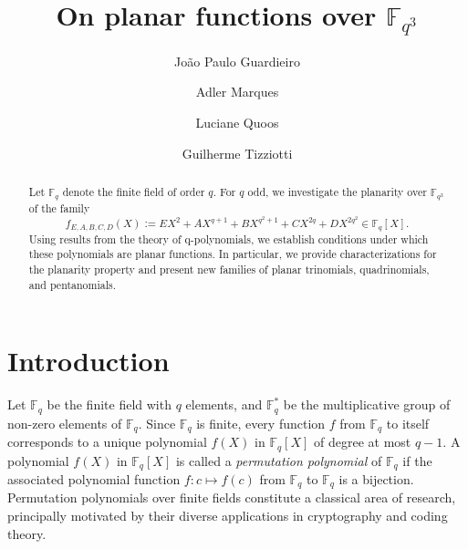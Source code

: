 \documentclass[12pt]{amsart}
\def\fq{\mathbb{F}_{q}}
\def\fqt{\mathbb{F}_{q^3}}
\begin{document}
	
\title[On planar functions over $\fqt$]{On planar functions over $\fqt$}
\author[J.P.Guardieiro]{João Paulo Guardieiro}
\address{Centro de Ciências Exatas e Tecnologia - Universidade Federal do Maranhão, Av. dos Portugueses, 1966 - Bacanga, São Luís - MA, Brazil.}
\address{Instituto de Matemática - Universidade Federal do Rio de Janeiro, Av. Athos da Silveira Ramos, 149 - Cidade Universitária, Rio de Janeiro - RJ, Brazil.}
\author[A. Marques]{Adler Marques}
\author[L. Quoos]{Luciane Quoos}
\author[G. Tizziotti]{Guilherme Tizziotti}
\address{Instituto de Matemática e Estatística - Universidade Federal de Uberlândia, Av. João Naves de Ávila, 2121 - Santa Mônica, Uberlândia - MG, Brazil.}

\begin{abstract} 
	Let $\mathbb{F}_q$ denote the finite field of order $q$. For $q$ odd, we investigate the planarity over $\mathbb{F}_{q^3}$ of the family
	$$
	f_{E,A,B,C,D}(X) := EX^2+ AX^{q+1}+ BX^{q^2+1}+CX^{2q} +DX^{2q^2}\in \mathbb{F}_{q}[X].
	$$
	Using results from the theory of q-polynomials, we establish conditions under which these polynomials are planar functions. In particular, we provide characterizations for the planarity property and present new families of planar trinomials, quadrinomials, and pentanomials.
\end{abstract}
\maketitle
	\section*{Introduction}
	
	Let $\fq$ be the finite field with $q$ elements, and $\mathbb{F}_{q}^{\ast} $ be the multiplicative group of non-zero elements of $\fq$. Since $\fq$ is finite, every function $f$ from $\mathbb{F}_q$ to itself corresponds to a unique polynomial $f(X)$ in $\mathbb{F}_q[X]$ of degree at most $q-1$. A polynomial $f(X)$ in $\fq[X]$ is called a {\it permutation polynomial} of $\fq$ if the associated polynomial function $f: c \mapsto f(c)$ from $\fq$ to $\fq$ is a bijection. Permutation polynomials over finite fields constitute a classical area of research, principally motivated by their diverse applications in cryptography and coding theory. 
	
\end{document}

